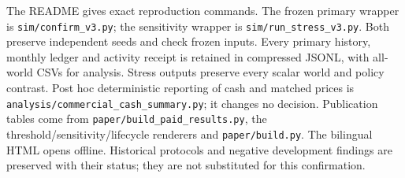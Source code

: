The README gives exact reproduction commands. The frozen primary wrapper is \texttt{sim/confirm\_v3.py}; the sensitivity wrapper is \texttt{sim/run\_stress\_v3.py}. Both preserve independent seeds and check frozen inputs. Every primary history, monthly ledger and activity receipt is retained in compressed JSONL, with all-world CSVs for analysis. Stress outputs preserve every scalar world and policy contrast. Post hoc deterministic reporting of cash and matched prices is \texttt{analysis/commercial\_cash\_summary.py}; it changes no decision. Publication tables come from \texttt{paper/build\_paid\_results.py}, the threshold/sensitivity/lifecycle renderers and \texttt{paper/build.py}. The bilingual HTML opens offline. Historical protocols and negative development findings are preserved with their status; they are not substituted for this confirmation.
